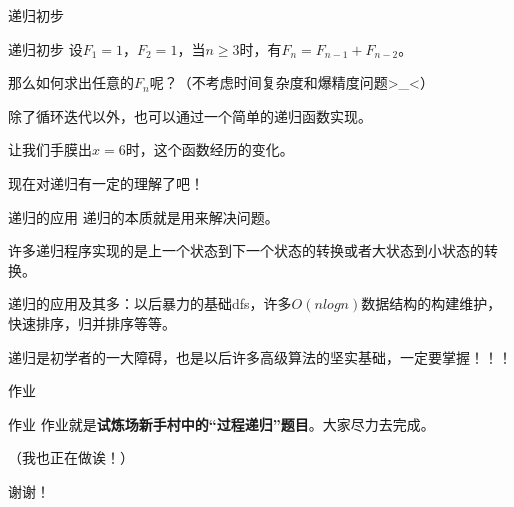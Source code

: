 \documentclass[UTF-8]{beamer}
\begin{document}
\begin{section}{递归初步}
\begin{frame}{递归初步}
    设$F_{1} = 1，F_{2} = 1$，当$n \geq 3$时，有$F_{n} = F_{n - 1} + F_{n - 2}$。\pause

    那么如何求出任意的$F_n$呢？（不考虑时间复杂度和爆精度问题>\_<）\pause%

    除了循环迭代以外，也可以通过一个简单的递归函数实现。\pause
    
    让我们手膜出$x=6$时，这个函数经历的变化。\pause

    现在对递归有一定的理解了吧！
\end{frame}
\begin{frame}{递归的应用}
    \pause
    递归的本质就是用来解决问题。\pause

    许多递归程序实现的是上一个状态到下一个状态的转换或者大状态到小状态的转换。\pause

    递归的应用及其多：以后暴力的基础dfs，许多$O(nlogn)$数据结构的构建维护，快速排序，归并排序等等。\pause

    递归是初学者的一大障碍，也是以后许多高级算法的坚实基础，一定要掌握！！！
\end{frame}
\end{section}

\begin{section}{作业}
\begin{frame}{作业}
    \pause
    作业就是\textbf{试炼场新手村中的“过程递归”题目}。大家尽力去完成。

    （我也正在做诶！）
\end{frame}
\end{section}

\begin{frame}
\begin{center}
\huge{谢谢！}
\end{center}
\end{frame}
\end{document}
